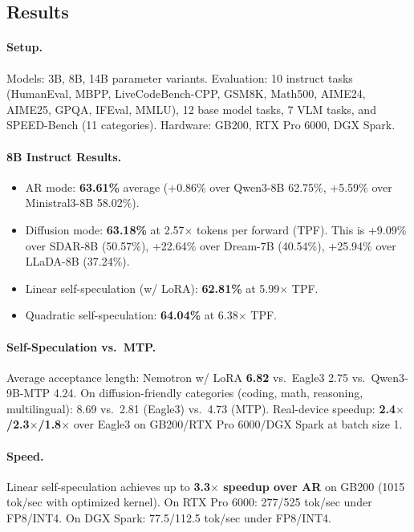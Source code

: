 \documentclass[11pt,a4paper]{article}
\begin{document}
\subsection{Results}

\paragraph{Setup.} Models: 3B, 8B, 14B parameter variants. Evaluation: 10 instruct tasks (HumanEval, MBPP, LiveCodeBench-CPP, GSM8K, Math500, AIME24, AIME25, GPQA, IFEval, MMLU), 12 base model tasks, 7 VLM tasks, and SPEED-Bench (11 categories). Hardware: GB200, RTX Pro 6000, DGX Spark.

\paragraph{8B Instruct Results.}
\begin{itemize}
\item AR mode: \textbf{63.61\%} average (+0.86\% over Qwen3-8B 62.75\%, +5.59\% over Ministral3-8B 58.02\%).
\item Diffusion mode: \textbf{63.18\%} at 2.57$\times$ tokens per forward (TPF). This is +9.09\% over SDAR-8B (50.57\%), +22.64\% over Dream-7B (40.54\%), +25.94\% over LLaDA-8B (37.24\%).
\item Linear self-speculation (w/ LoRA): \textbf{62.81\%} at 5.99$\times$ TPF.
\item Quadratic self-speculation: \textbf{64.04\%} at 6.38$\times$ TPF.
\end{itemize}

\paragraph{Self-Speculation vs.\ MTP.} Average acceptance length: Nemotron w/ LoRA \textbf{6.82} vs.\ Eagle3 2.75 vs.\ Qwen3-9B-MTP 4.24. On diffusion-friendly categories (coding, math, reasoning, multilingual): 8.69 vs.\ 2.81 (Eagle3) vs.\ 4.73 (MTP). Real-device speedup: \textbf{2.4$\times$/2.3$\times$/1.8$\times$} over Eagle3 on GB200/RTX Pro 6000/DGX Spark at batch size 1.

\paragraph{Speed.} Linear self-speculation achieves up to \textbf{3.3$\times$ speedup over AR} on GB200 (1015 tok/sec with optimized kernel). On RTX Pro 6000: 277/525 tok/sec under FP8/INT4. On DGX Spark: 77.5/112.5 tok/sec under FP8/INT4.
\end{document}
